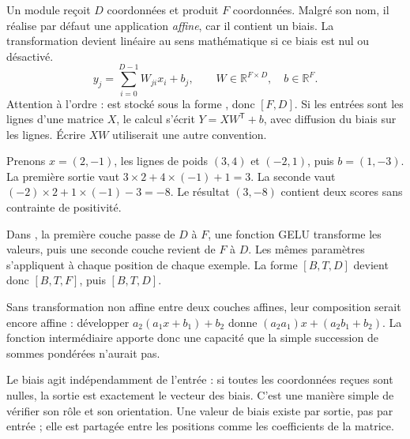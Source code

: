 Un module  reçoit \(D\) coordonnées et
produit \(F\) coordonnées. Malgré son nom, il réalise par défaut
une application \emph{affine}, car il contient un biais.
La transformation devient linéaire au sens mathématique si ce biais
est nul ou désactivé.
\[
 y_j=\sum_{i=0}^{D-1}W_{ji}x_i+b_j,
 \qquad W\in\mathbb{R}^{F\times D},\quad b\in\mathbb{R}^{F}.
\]
Attention à l'ordre :  est stocké sous la forme
, donc \([F,D]\).
Si les entrées sont les lignes d'une matrice \(X\), le calcul
s'écrit \(Y=XW^{\mathsf T}+b\), avec diffusion du biais sur
les lignes. Écrire \(XW\) utiliserait une autre convention.

Prenons \(x=(2,-1)\), les lignes de poids \((3,4)\) et
\((-2,1)\), puis \(b=(1,-3)\).
La première sortie vaut \(3\times2+4\times(-1)+1=3\).
La seconde vaut \((-2)\times2+1\times(-1)-3=-8\).
Le résultat \((3,-8)\) contient deux scores sans contrainte
de positivité.

Dans , la première couche passe de \(D\)
à \(F\), une fonction GELU transforme les valeurs, puis une
seconde couche revient de \(F\) à \(D\). Les mêmes paramètres
s'appliquent à chaque position de chaque exemple. La forme
\([B,T,D]\) devient donc \([B,T,F]\), puis \([B,T,D]\).

Sans transformation non affine entre deux couches affines,
leur composition serait encore affine : développer
\(a_2(a_1x+b_1)+b_2\) donne
\((a_2a_1)x+(a_2b_1+b_2)\).
La fonction intermédiaire apporte donc une capacité que la simple
succession de sommes pondérées n'aurait pas.

Le biais agit indépendamment de l'entrée : si toutes les
coordonnées reçues sont nulles, la sortie est exactement le
vecteur des biais. C'est une manière simple de vérifier son
rôle et son orientation. Une valeur de biais existe par sortie,
pas par entrée ; elle est partagée entre les positions comme
les coefficients de la matrice.



